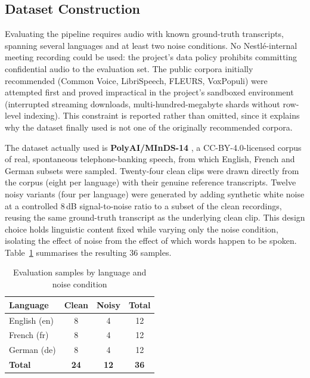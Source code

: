 \documentclass[12pt]{report}
\begin{document}
\subsection{Dataset Construction}

Evaluating the pipeline requires audio with known ground-truth transcripts, spanning several languages and at least two noise conditions. No Nestl\'e-internal meeting recording could be used: the project's data policy prohibits committing confidential audio to the evaluation set. The public corpora initially recommended (Common Voice, LibriSpeech, FLEURS, VoxPopuli) were attempted first and proved impractical in the project's sandboxed environment (interrupted streaming downloads, multi-hundred-megabyte shards without row-level indexing). This constraint is reported rather than omitted, since it explains why the dataset finally used is not one of the originally recommended corpora.

The dataset actually used is \textbf{PolyAI/MInDS-14} \cite{gerz2021multilingual}, a CC-BY-4.0-licensed corpus of real, spontaneous telephone-banking speech, from which English, French and German subsets were sampled. Twenty-four clean clips were drawn directly from the corpus (eight per language) with their genuine reference transcripts. Twelve noisy variants (four per language) were generated by adding synthetic white noise at a controlled 8\,dB signal-to-noise ratio to a subset of the clean recordings, reusing the same ground-truth transcript as the underlying clean clip. This design choice holds linguistic content fixed while varying only the noise condition, isolating the effect of noise from the effect of which words happen to be spoken. Table~\ref{tab:dataset} summarises the resulting 36 samples.

\begin{table}[H]
\centering
\begin{tabular}{|l|c|c|c|}
\hline
\textbf{Language} & \textbf{Clean} & \textbf{Noisy} & \textbf{Total} \\ \hline
English (en) & 8 & 4 & 12 \\ \hline
French (fr) & 8 & 4 & 12 \\ \hline
German (de) & 8 & 4 & 12 \\ \hline
\textbf{Total} & \textbf{24} & \textbf{12} & \textbf{36} \\ \hline
\end{tabular}
\caption{Evaluation samples by language and noise condition}
\label{tab:dataset}
\end{table}
\end{document}
